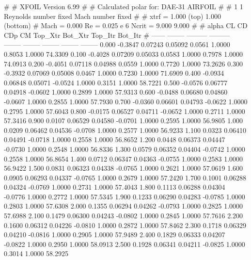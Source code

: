 #  
#       XFOIL         Version 6.99
#  
# Calculated polar for: DAE-31 AIRFOIL                                  
#  
# 1 1 Reynolds number fixed          Mach number fixed         
#  
# xtrf =   1.000 (top)        1.000 (bottom)  
# Mach =   0.000     Re =     0.025 e 6     Ncrit =   9.000  9.000
#  
#   alpha    CL        CD       CDp       CM     Top_Xtr  Bot_Xtr  Top_Itr  Bot_Itr
#  ------ -------- --------- --------- -------- -------- -------- -------- --------
   0.000  -0.3847   0.07243   0.05092   0.0561   1.0000   0.8053   1.0000  74.3309
   0.100  -0.4028   0.07209   0.05033   0.0583   1.0000   0.7978   1.0000  74.0913
   0.200  -0.4051   0.07118   0.04988   0.0559   1.0000   0.7720   1.0000  73.2626
   0.300  -0.3932   0.07069   0.05008   0.0467   1.0000   0.7230   1.0000  71.6909
   0.400  -0.0934   0.06848   0.05071  -0.0524   1.0000   0.3151   1.0000  58.7221
   0.500  -0.0576   0.06777   0.04918  -0.0602   1.0000   0.2899   1.0000  57.9313
   0.600  -0.0488   0.06680   0.04860  -0.0607   1.0000   0.2855   1.0000  57.7930
   0.700  -0.0360   0.06601   0.04793  -0.0622   1.0000   0.2795   1.0000  57.6043
   0.800  -0.0175   0.06527   0.04711  -0.0652   1.0000   0.2711   1.0000  57.3416
   0.900   0.0107   0.06529   0.04580  -0.0701   1.0000   0.2595   1.0000  56.9805
   1.000   0.0209   0.06462   0.04536  -0.0708   1.0000   0.2577   1.0000  56.9233
   1.100   0.0323   0.06410   0.04491  -0.0718   1.0000   0.2558   1.0000  56.8652
   1.200   0.0448   0.06373   0.04447  -0.0730   1.0000   0.2548   1.0000  56.8336
   1.300   0.0579   0.06352   0.04404  -0.0742   1.0000   0.2558   1.0000  56.8654
   1.400   0.0712   0.06347   0.04363  -0.0755   1.0000   0.2583   1.0000  56.9422
   1.500   0.0831   0.06323   0.04338  -0.0765   1.0000   0.2621   1.0000  57.0619
   1.600   0.0905   0.06293   0.04337  -0.0765   1.0000   0.2679   1.0000  57.2420
   1.700   0.1001   0.06288   0.04324  -0.0769   1.0000   0.2731   1.0000  57.4043
   1.800   0.1113   0.06288   0.04304  -0.0776   1.0000   0.2772   1.0000  57.5345
   1.900   0.1233   0.06290   0.04283  -0.0785   1.0000   0.2803   1.0000  57.6308
   2.000   0.1355   0.06294   0.04262  -0.0793   1.0000   0.2825   1.0000  57.6988
   2.100   0.1479   0.06300   0.04243  -0.0802   1.0000   0.2845   1.0000  57.7616
   2.200   0.1600   0.06312   0.04226  -0.0810   1.0000   0.2872   1.0000  57.8462
   2.300   0.1718   0.06329   0.04210  -0.0816   1.0000   0.2905   1.0000  57.9489
   2.400   0.1829   0.06333   0.04207  -0.0822   1.0000   0.2950   1.0000  58.0913
   2.500   0.1928   0.06341   0.04211  -0.0825   1.0000   0.3014   1.0000  58.2925
